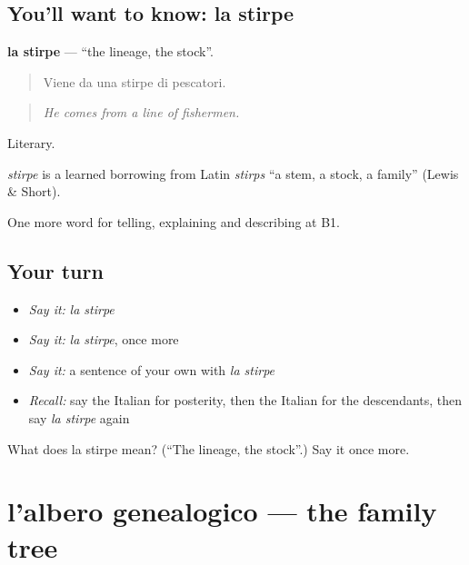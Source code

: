 \subsection*{You'll want to know: la stirpe}
\textbf{la stirpe} — \textquotedblleft{}the lineage, the stock\textquotedblright{}.

\begin{quote}
Viene da una stirpe di pescatori.
\end{quote}

\begin{quote}
\emph{He comes from a line of fishermen.}
\end{quote}

Literary.

\begin{cousinweb}
\emph{stirpe} is a learned borrowing from Latin \emph{stirps} \textquotedblleft{}a stem, a stock, a family\textquotedblright{} (Lewis \& Short).
\end{cousinweb}

\begin{grammarlens}[title={What you've built}]
One more word for telling, explaining and describing at B1.
\end{grammarlens}

\subsection*{Your turn}
\begin{itemize}
\raggedright
  \item \emph{Say it:} \emph{la stirpe}
  \item \emph{Say it:} \emph{la stirpe}, once more
  \item \emph{Say it:} a sentence of your own with \emph{la stirpe}
  \item \emph{Recall:} say the Italian for posterity, then the Italian for the descendants, then say \emph{la stirpe} again
\end{itemize}

\begin{tcolorbox}[breakable,colback=teal!4,colframe=teal!35!black,title={Before you move on}]
What does la stirpe mean? (\textquotedblleft{}The lineage, the stock\textquotedblright{}.) Say it once more.
\end{tcolorbox}
\section[l'albero genealogico]{l'albero genealogico — the family tree}

